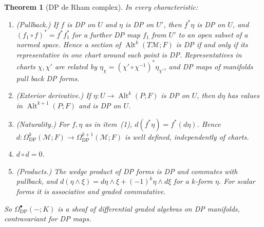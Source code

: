 \documentclass[11pt]{amsart}
\newtheorem{theorem}{Theorem}[section]
\theoremstyle{definition}
\theoremstyle{remark}
\numberwithin{equation}{section}
\newcommand{\Alt}{\operatorname{Alt}}
\theoremstyle{plain}
\theoremstyle{definition}
\theoremstyle{plain}
\newcommand{\cM}{\mathcal M}
\begin{document}
\begin{theorem}[DP de Rham complex]\label{dp:thm:de-rham}
In every characteristic:
\begin{enumerate}
\item \textup{(Pullback.)} If $f$ is DP on $U$ and $\eta$ is DP on $U'$, then $f^*\eta$ is DP on $U$, and $(f_1\circ f)^*=f^*f_1^*$ for a further DP map $f_1$ from $U'$ to an open subset of a normed space. Hence a section of $\Alt^k(T\cM;F)$ is DP if and only if its representative in one chart around each point is DP. Representatives in charts $\chi,\chi'$ are related by $\eta_\chi=(\chi'\circ\chi^{-1})^*\eta_{\chi'}$, and DP maps of manifolds pull back DP forms.
\item \textup{(Exterior derivative.)} If $\eta\colon U\to\Alt^k(P;F)$ is DP on $U$, then $d\eta$ has values in $\Alt^{k+1}(P;F)$ and is DP on $U$.
\item \textup{(Naturality.)} For $f,\eta$ as in item~\textup{(1)}, $d(f^*\eta)=f^*(d\eta)$. Hence $d\colon\Omega^k_{\mathrm{DP}}(\cM;F)\to\Omega^{k+1}_{\mathrm{DP}}(\cM;F)$ is well defined, independently of charts.
\item $d\circ d=0$.
\item \textup{(Products.)} The wedge product of DP forms is DP and commutes with pullback, and $d(\eta\wedge\xi)=d\eta\wedge\xi+(-1)^k\eta\wedge d\xi$ for a $k$-form $\eta$. For scalar forms it is associative and graded commutative.
\end{enumerate}
So $\Omega^\bullet_{\mathrm{DP}}(-;K)$ is a sheaf of differential graded algebras on DP manifolds, contravariant for DP maps.
\end{theorem}
\end{document}
